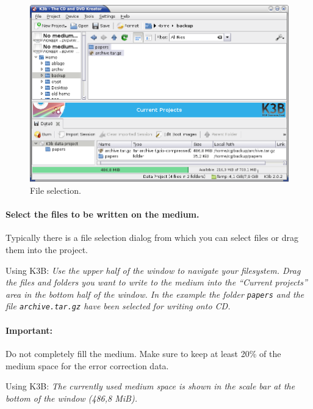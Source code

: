 \newpage
\begin{figure}[h]
\centerline{\includegraphics[width=\textwidth]{screenshots/make-iso2.png}}
\caption{File selection.}  
\label{howto-augment-make-iso-file-selection}
\end{figure}

\paragraph{Select the files to be written on the medium.} Typically there
is a file selection dialog from which you can select files or drag them into the project.

\medskip

Using K3B: {\em Use the upper half of the window to navigate your
  filesystem. Drag the files and folders you want to write to the
  medium into the ``Current projects'' area in the bottom half of the
  window. In the example the folder {\tt papers} and the file {\tt archive.tar.gz}
  have been selected for writing onto CD.}

\medskip

\paragraph{Important:} Do not completely fill the medium.
Make sure to keep at least 20\% of the medium space for the error correction data.

\medskip

Using K3B: {\em The currently used medium space is shown in the
  scale bar at the bottom of the window (486,8 MiB).} 

